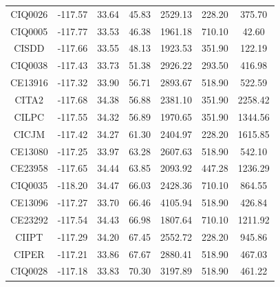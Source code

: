 \begin{table}[!ht]
{\begin{tabular}{@{}ccccccc@{}}
      CIQ0026    & -117.57           & 33.64             & 45.83           & 2529.13     & 228.20          & 375.70        \\
      CIQ0005    & -117.77           & 33.53             & 46.38           & 1961.18     & 710.10          & 42.60         \\
      CISDD      & -117.66           & 33.55             & 48.13           & 1923.53     & 351.90          & 122.19        \\
      CIQ0038    & -117.43           & 33.73             & 51.38           & 2926.22     & 293.50          & 416.98        \\
      CE13916    & -117.32           & 33.90             & 56.71           & 2893.67     & 518.90          & 522.59        \\
      CITA2      & -117.68           & 34.38             & 56.88           & 2381.10     & 351.90          & 2258.42       \\
      CILPC      & -117.55           & 34.32             & 56.89           & 1970.65     & 351.90          & 1344.56       \\
      CICJM      & -117.42           & 34.27             & 61.30           & 2404.97     & 228.20          & 1615.85       \\
      CE13080    & -117.25           & 33.97             & 63.28           & 2607.63     & 518.90          & 542.10        \\
      CE23958    & -117.65           & 34.44             & 63.85           & 2093.92     & 447.28          & 1236.29       \\
      CIQ0035    & -118.20           & 34.47             & 66.03           & 2428.36     & 710.10          & 864.55        \\
      CE13096    & -117.27           & 33.70             & 66.46           & 4105.94     & 518.90          & 426.84        \\
      CE23292    & -117.54           & 34.43             & 66.98           & 1807.64     & 710.10          & 1211.92       \\
      CIIPT      & -117.29           & 34.20             & 67.45           & 2552.72     & 228.20          & 945.86        \\
      CIPER      & -117.21           & 33.86             & 67.67           & 2880.41     & 518.90          & 467.03        \\
      CIQ0028    & -117.18           & 33.83             & 70.30           & 3197.89     & 518.90          & 461.22        \\

\end{tabular}}
\end{table}
